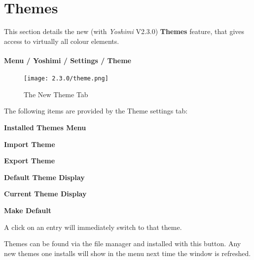%
%
%

\section{Themes}
\label{sec:themes}

   This section details the new (with \textsl{Yoshimi} V2.3.0) \textbf{Themes}
   feature, that gives access to virtually all colour elements.

\paragraph{Menu / Yoshimi / Settings / Theme}
\label{paragraph:menu_yoshimi_settings_themes}

\begin{figure}[H]
   \centering
   \texttt{[image: 2.3.0/theme.png]}
   \caption[Theme Options]{The New Theme Tab}
   \label{fig:yoshimi_settings_themes}
\end{figure}

   The following items are provided by the Theme settings tab:

   \begin{enumber}
      \item \textbf{Installed Themes Menu}
      \item \textbf{Import Theme}
      \item \textbf{Export Theme}
      \item \textbf{Default Theme Display}
      \item \textbf{Current Theme Display}
      \item \textbf{Make Default}
   \end{enumber}

   \setcounter{ItemCounter}{0}      %

    {}A click on an entry will immediately switch
   to that theme.

    {}Themes can be found via the file manager and
   installed with this button. Any new themes one installs will show in the menu
   next time the window is refreshed.

